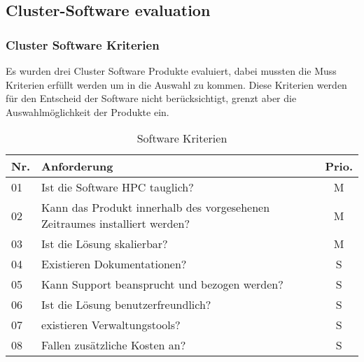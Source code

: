 \subsection{Cluster-Software evaluation}
\subsubsection{Cluster Software Kriterien}
Es wurden drei Cluster Software Produkte evaluiert, dabei mussten die Muss Kriterien erfüllt werden um in die Auswahl zu kommen. Diese Kriterien werden für den Entscheid der Software nicht berücksichtigt, grenzt aber die Auswahlmöglichkeit der Produkte ein.

\begin{table}[H]
\begin{tabular}[t]{p{0.7cm}|p{14cm}c}
\hline
\rowcolor{heading}\textbf{Nr.} & \textbf{Anforderung} & \textbf{Prio.} \\\hline
01 & Ist die Software HPC tauglich? & M \\\hline
02 & Kann das Produkt innerhalb des vorgesehenen Zeitraumes installiert werden? & M \\\hline
03 & Ist die Lösung skalierbar? &  M \\\hline
04 & Existieren Dokumentationen? & S \\\hline
05 & Kann Support beansprucht und bezogen werden? & S \\\hline
06 & Ist die Lösung benutzerfreundlich? & S \\\hline
07 & existieren Verwaltungstools? & S \\\hline
08 & Fallen zusätzliche Kosten an? & S \\\hline
\end{tabular}
\caption{Software Kriterien}
\end{table}


